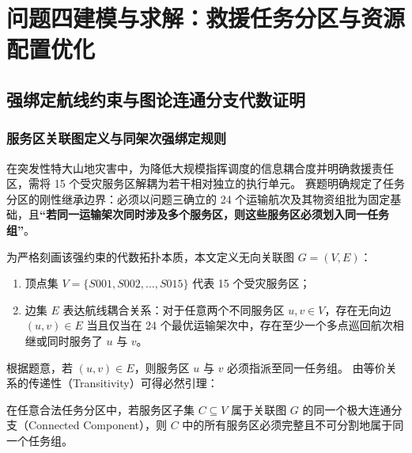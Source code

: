 \section{问题四建模与求解：救援任务分区与资源配置优化}

\subsection{强绑定航线约束与图论连通分支代数证明}

\subsubsection{服务区关联图定义与同架次强绑定规则}
在突发性特大山地灾害中，为降低大规模指挥调度的信息耦合度并明确救援责任区，需将 15 个受灾服务区解耦为若干相对独立的执行单元。
赛题明确规定了任务分区的刚性继承边界：必须以问题三确立的 24 个运输航次及其物资组批为固定基础，且\textbf{“若同一运输架次同时涉及多个服务区，则这些服务区必须划入同一任务组”}。

为严格刻画该强约束的代数拓扑本质，本文定义无向关联图 $G = (V, E)$：
\begin{enumerate}
    \item 顶点集 $V = \{S001, S002, \dots, S015\}$ 代表 15 个受灾服务区；
    \item 边集 $E$ 表达航线耦合关系：对于任意两个不同服务区 $u, v \in V$，存在无向边 $(u, v) \in E$ 当且仅当在 24 个最优运输架次中，存在至少一个多点巡回航次相继或同时服务了 $u$ 与 $v$。
\end{enumerate}

根据题意，若 $(u, v) \in E$，则服务区 $u$ 与 $v$ 必须指派至同一任务组。
由等价关系的传递性（Transitivity）可得必然引理：
\begin{lemma}[图论连通分支不可分引理]
在任意合法任务分区中，若服务区子集 $C \subseteq V$ 属于关联图 $G$ 的同一个极大连通分支（Connected Component），则 $C$ 中的所有服务区必须完整且不可分割地属于同一个任务组。
\end{lemma}

